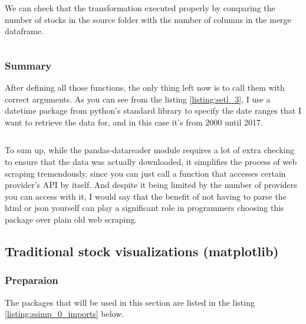 \documentclass[12pt, a4paper]{article}
\begin{document}
We can check that the transformation executed properly by comparing the number of stocks in the source folder with the number of columns in the merge dataframe.

\bgroup
  \inputminted[linenos, breaklines=true, fontsize=\scriptsize]{python}{src/stocks/verify.py}
  \label{listing:stocks_verify}
\egroup

\subsubsection{Summary}

After defining all those functions, the only thing left now is to call them with correct arguments. As you can see from the listing \ref{listing:setl_3}, I use a datetime package from python’s standard library to specify the date ranges that I want to retrieve the data for, and in this case it’s from 2000 until 2017.

\bgroup
  \inputminted[linenos, breaklines=true, fontsize=\scriptsize, firstnumber=last]{python}{src/stocks/etl/3_executing.py}
  \label{listing:setl_3}
\egroup

To sum up, while the pandas-datareader module requires a lot of extra checking to ensure that the data was actually downloaded, it simplifies the process of web scraping tremendously, since you can just call a function that accesses certain provider’s API by itself. And despite it being limited by the number of providers you can access with it, I would say that the benefit of not having to parse the html or json yourself can play a significant role in programmers choosing this package over plain old web scraping.



\subsection{Traditional stock visualizations (matplotlib)}

\subsubsection{Preparaion}

The packages that will be used in this section are listed in the listing \ref{listing:ssimp_0_imports} below.
\end{document}
